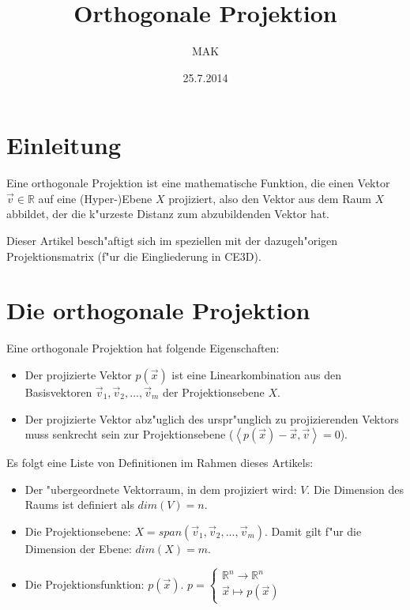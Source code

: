 \documentclass{article}
\newcommand{\lrangle}[1]{\left\langle #1 \right\rangle}
\begin{document}
\title{Orthogonale Projektion}
\author{MAK}
\date{25.7.2014}


\maketitle






\section{Einleitung}

Eine orthogonale Projektion ist eine mathematische Funktion, die einen Vektor
\(\vec{v}\in\mathbb{R}\) auf eine (Hyper-)Ebene \(X\) projiziert, also den Vektor aus dem Raum
\(X\) abbildet, der die k"urzeste Distanz zum abzubildenden Vektor hat.

Dieser Artikel besch"aftigt sich im speziellen mit der dazugeh"origen Projektionsmatrix (f"ur die
Eingliederung in CE3D).






\section{Die orthogonale Projektion}

Eine orthogonale Projektion hat folgende Eigenschaften:

	\begin{itemize}
		\item Der projizierte Vektor \(p(\vec{x})\) ist eine Linearkombination aus den Basisvektoren
		      \(\vec{v}_1,\vec{v}_2,...,\vec{v}_m\) der Projektionsebene \(X\).
		\item Der projizierte Vektor abz"uglich des urspr"unglich zu projizierenden Vektors muss
		      senkrecht sein zur Projektionsebene (\(\lrangle{ p(\vec{x})-\vec{x},\vec{v} } =0\)).
	\end{itemize}

Es folgt eine Liste von Definitionen im Rahmen dieses Artikels:

	\begin{itemize}
		\item Der "ubergeordnete Vektorraum, in dem projiziert wird: \(V\). Die Dimension
		      des Raums ist definiert als \(dim(V)=n\).
		\item Die Projektionsebene: \(X=span(\vec{v}_1,\vec{v}_2,...,\vec{v}_m)\). Damit gilt f"ur
		      die Dimension der Ebene: \(dim(X)=m\).
		\item Die Projektionsfunktion: \(p(\vec{x})\).
		      \(p = \left\{\begin{array}{l}\mathbb{R}^n\to \mathbb{R}^n\\\vec{x}\mapsto
		      p(\vec{x})\end{array} \right.\)
	\end{itemize}
\end{document}
